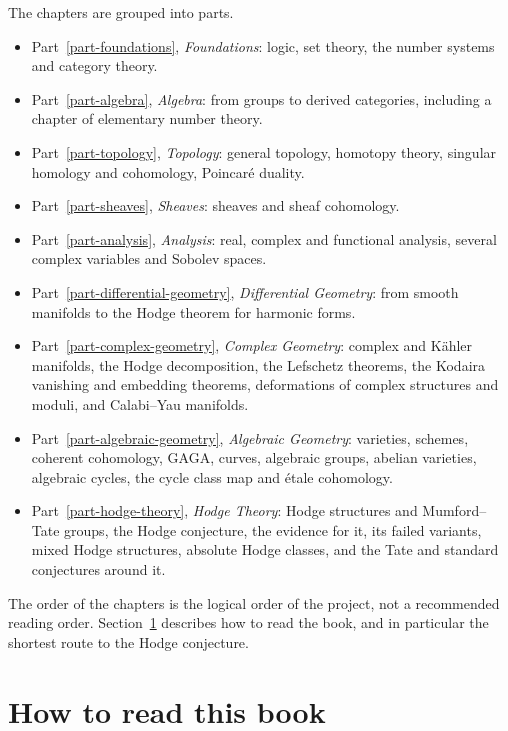 The chapters are grouped into parts.
\begin{itemize}
\item Part~\ref{part-foundations}, \emph{Foundations}: logic, set theory, the
number systems and category theory.
\item Part~\ref{part-algebra}, \emph{Algebra}: from groups to derived
categories, including a chapter of elementary number theory.
\item Part~\ref{part-topology}, \emph{Topology}: general topology, homotopy
theory, singular homology and cohomology, Poincar\'e duality.
\item Part~\ref{part-sheaves}, \emph{Sheaves}: sheaves and sheaf cohomology.
\item Part~\ref{part-analysis}, \emph{Analysis}: real, complex and functional
analysis, several complex variables and Sobolev spaces.
\item Part~\ref{part-differential-geometry}, \emph{Differential Geometry}: from
smooth manifolds to the Hodge theorem for harmonic forms.
\item Part~\ref{part-complex-geometry}, \emph{Complex Geometry}: complex and
K\"ahler manifolds, the Hodge decomposition, the Lefschetz theorems, the
Kodaira vanishing and embedding theorems, deformations of complex structures and
moduli, and Calabi--Yau manifolds.
\item Part~\ref{part-algebraic-geometry}, \emph{Algebraic Geometry}: varieties,
schemes, coherent cohomology, GAGA, curves, algebraic groups, abelian
varieties, algebraic cycles, the cycle class map and \'etale cohomology.
\item Part~\ref{part-hodge-theory}, \emph{Hodge Theory}: Hodge structures and
Mumford--Tate groups, the Hodge conjecture, the evidence for it, its failed
variants, mixed Hodge structures, absolute Hodge classes, and the Tate and
standard conjectures around it.
\end{itemize}
The order of the chapters is the logical order of the project, not a
recommended reading order. Section~\ref{introduction:section-path} describes
how to read the book, and in particular the shortest route to the Hodge
conjecture.

\section{How to read this book}\label{introduction:section-path}

